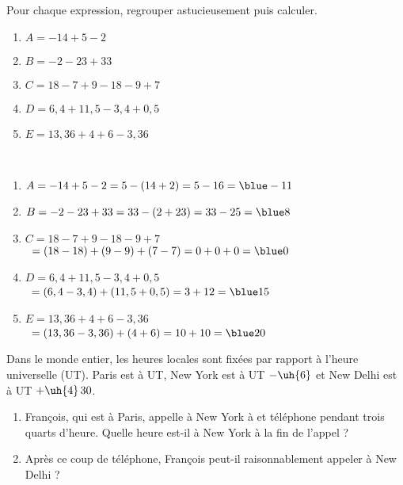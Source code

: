 \begin{colonne*exercice}
\medskip


\begin{exercice} %
   Pour chaque expression, regrouper astucieusement puis calculer.
   \begin{enumerate}
      \item $A =-14+5-2$
      \item $B =-2-23+33$
      \item $C =18-7+9-18-9+7$
      \item $D =6,4+11,5-3,4+0,5$
      \item $E =13,36+4+6-3,36$
   \end{enumerate}
\end{exercice}

\begin{corrige}
   \ \\[-5mm]
   \begin{enumerate}
      \item $A =-14+5-2 =5-(14+2) =5-16 =\blue -11$
      \item $B =-2-23+33 =33-(2+23) =33-25 =\blue 8$
      \item $C =18-7+9-18-9+7$ \\
          \qquad\, $=(18-18)+(9-9)+(7-7) =0+0+0 =\blue 0$
      \item $D =6,4+11,5-3,4+0,5$ \\
         \qquad\, $=(6,4-3,4)+(11,5+0,5) =3+12 =\blue 15$
   \end{enumerate}
   
\Coupe

   \begin{enumerate}
   \setcounter{enumi}{4}
      \item $E =13,36+4+6-3,36$ \\
         \qquad\, $=(13,36-3,36)+(4+6) =10+10 =\blue 20$
   \end{enumerate}
\end{corrige}

\bigskip


\smallskip

\begin{exercice} %
   Dans le monde entier, les heures locales sont fixées par rapport à l'heure universelle (UT). Paris est à UT, New York est à UT $-\uh{6}$ et New Delhi est à UT $+\uh{4}\,30$.
   \begin{enumerate}
      \item François, qui est à Paris, appelle à New York à  et téléphone pendant trois quarts d'heure. Quelle heure est-il à New York à la fin de l'appel ?
      \item Après ce coup de téléphone, François peut-il raisonnablement appeler à New Delhi ?
   \end{enumerate}
\end{exercice}


\end{colonne*exercice}
